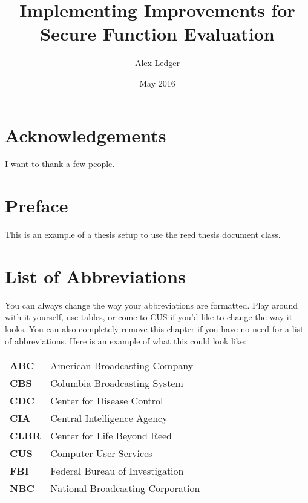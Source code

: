 \documentclass[12pt,twoside]{reedthesis}
\title{Implementing Improvements for Secure Function Evaluation}
\author{Alex Ledger}
\date{May 2016}
\begin{document}
\maketitle
\frontmatter %
\pagestyle{empty} %

\chapter*{Acknowledgements}
I want to thank a few people.

\chapter*{Preface}
This is an example of a thesis setup to use the reed thesis document class.

\chapter*{List of Abbreviations}
You can always change the way your abbreviations are formatted. Play around with it yourself, use tables, or come to CUS if you'd like to change the way it looks. You can also completely remove this chapter if you have no need for a list of abbreviations. Here is an example of what this could look like:

\begin{table}[h]
\centering %
\begin{tabular}{ll}
	\textbf{ABC}  	&  American Broadcasting Company \\
	\textbf{CBS}  	&  Columbia Broadcasting System\\
	\textbf{CDC}  	&  Center for Disease Control \\
	\textbf{CIA}  	&  Central Intelligence Agency\\
	\textbf{CLBR} 	&  Center for Life Beyond Reed\\
	\textbf{CUS}  	&  Computer User Services\\
	\textbf{FBI}  	&  Federal Bureau of Investigation\\
	\textbf{NBC}  	&  National Broadcasting Corporation\\
\end{tabular}
\end{table}
	
\tableofcontents
\listoftables
\listoffigures
\end{document}
